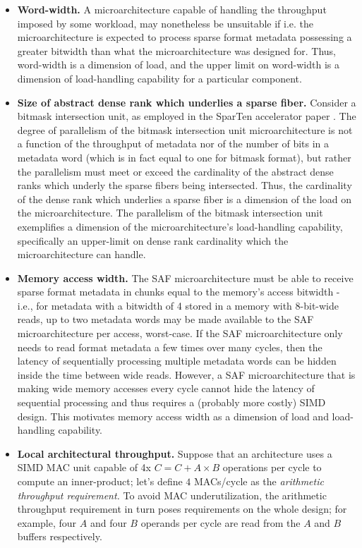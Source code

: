 \begin{itemize}
    \item \textbf{Word-width.} A microarchitecture capable of handling the throughput imposed by some workload, may nonetheless be unsuitable if i.e. the microarchitecture is expected to process sparse format metadata possessing a greater bitwidth than what the microarchitecture was designed for. Thus, word-width is a dimension of load, and the upper limit on word-width is a dimension of load-handling capability for a particular component.
    \item \textbf{Size of abstract dense rank which underlies a sparse fiber.} Consider a bitmask intersection unit, as employed in the SparTen accelerator paper \cite{sparten}. The degree of parallelism of the bitmask intersection unit microarchitecture is not a function of the throughput of metadata nor of the number of bits in a metadata word (which is in fact equal to one for bitmask format), but rather the parallelism must meet or exceed the cardinality of the abstract dense ranks which underly the sparse fibers being intersected. Thus, the cardinality of the dense rank which underlies a sparse fiber is a dimension of the load on the microarchitecture. The parallelism of the bitmask intersection unit exemplifies a dimension of the microarchitecture's load-handling capability, specifically an upper-limit on dense rank cardinality which the microarchitecture can handle.
    \item \textbf{Memory access width.} The SAF microarchitecture must be able to receive sparse format metadata in chunks equal to the memory's access bitwidth - i.e., for metadata with a bitwidth of 4 stored in a memory with 8-bit-wide reads, up to two metadata words may be made available to the SAF microarchitecture per access, worst-case. If the SAF microarchitecture only needs to read format metadata a few times over many cycles, then the latency of sequentially processing multiple metadata words can be hidden inside the time between wide reads. However, a SAF microarchitecture that is making wide memory accesses every cycle cannot hide the latency of sequential processing and thus requires a (probably more costly) SIMD design. This motivates memory access width as a dimension of load and load-handling capability.
    \item \textbf{Local architectural throughput.} Suppose that an architecture uses a SIMD MAC unit capable of 4x $C = C + A \times B$ operations per cycle to compute an inner-product; let's define $4$ MACs/cycle as the \textit{arithmetic throughput requirement.} To avoid MAC underutilization, the arithmetic throughput requirement in turn poses requirements on the whole design; for example, four $A$ and four $B$ operands per cycle are read from the $A$ and $B$ buffers respectively. 
    

\end{itemize}
